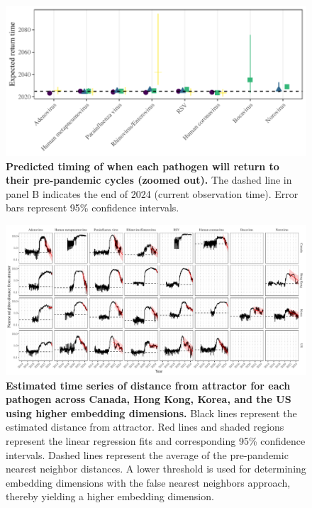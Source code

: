 \documentclass[12pt]{article}
\begin{document}
\pagebreak

\begin{figure}[!th]
\includegraphics[width=\textwidth]{../figure4/figure4_unzoom.pdf}
\caption{
\textbf{Predicted timing of when each pathogen will return to their pre-pandemic cycles (zoomed out).}
The dashed line in panel B indicates the end of 2024 (current observation time).
Error bars represent 95\% confidence intervals.
}
\end{figure}

\pagebreak

\begin{figure}[!th]
\includegraphics[width=\textwidth]{../figure4_th/figure4_dist_th.pdf}
\caption{
\textbf{Estimated time series of distance from attractor for each pathogen across Canada, Hong Kong, Korea, and the US using higher embedding dimensions.}
Black lines represent the estimated distance from attractor.
Red lines and shaded regions represent the linear regression fits and corresponding 95\% confidence intervals.
Dashed lines represent the average of the pre-pandemic nearest neighbor distances.
A lower threshold is used for determining embedding dimensions with the false nearest neighbors approach, thereby yielding a higher embedding dimension.
}
\end{figure}
\end{document}
